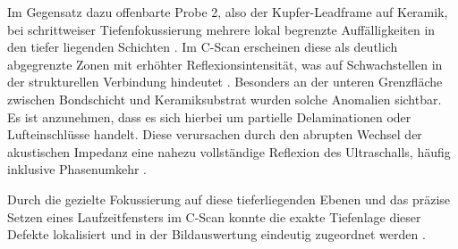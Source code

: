 Im Gegensatz dazu offenbarte Probe 2, also der Kupfer-Leadframe auf Keramik, bei schrittweiser Tiefenfokussierung mehrere lokal begrenzte Auffälligkeiten in den tiefer liegenden Schichten \cite{hennig2025}. Im C-Scan erscheinen diese als deutlich abgegrenzte Zonen mit erhöhter Reflexionsintensität, was auf Schwachstellen in der strukturellen Verbindung hindeutet \cite{pvateplaSAM}. Besonders an der unteren Grenzfläche zwischen Bondschicht und Keramiksubstrat wurden solche Anomalien sichtbar. Es ist anzunehmen, dass es sich hierbei um partielle Delaminationen oder Lufteinschlüsse handelt. Diese verursachen durch den abrupten Wechsel der akustischen Impedanz eine nahezu vollständige Reflexion des Ultraschalls, häufig inklusive Phasenumkehr \cite{wikiSAM2024}.

Durch die gezielte Fokussierung auf diese tieferliegenden Ebenen und das präzise Setzen eines Laufzeitfensters im C-Scan konnte die exakte Tiefenlage dieser Defekte lokalisiert und in der Bildauswertung eindeutig zugeordnet werden \cite{hennig2025}.